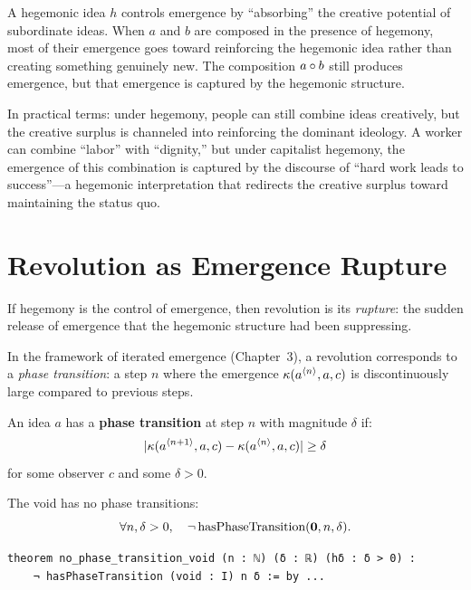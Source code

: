 \begin{interpretation}
A hegemonic idea $h$ controls emergence by ``absorbing'' the creative potential
of subordinate ideas. When $a$ and $b$ are composed in the presence of hegemony,
most of their emergence goes toward reinforcing the hegemonic idea rather than
creating something genuinely new. The composition $a \circ b$ still produces
emergence, but that emergence is captured by the hegemonic structure.

In practical terms: under hegemony, people can still combine ideas creatively,
but the creative surplus is channeled into reinforcing the dominant ideology.
A worker can combine ``labor'' with ``dignity,'' but under capitalist hegemony,
the emergence of this combination is captured by the discourse of ``hard work
leads to success''---a hegemonic interpretation that redirects the creative
surplus toward maintaining the status quo.
\end{interpretation}


\section{Revolution as Emergence Rupture}

If hegemony is the control of emergence, then revolution is its \emph{rupture}:
the sudden release of emergence that the hegemonic structure had been suppressing.

In the framework of iterated emergence (Chapter~3), a revolution corresponds to
a \emph{phase transition}: a step $n$ where the emergence $\kappa(a^{\langle n \rangle}, a, c)$
is discontinuously large compared to previous steps.

\begin{definition}
\label{def:phase-transition}
An idea $a$ has a \textbf{phase transition} at step $n$ with magnitude $\delta$ if:
\[
  |\kappa(a^{\langle n+1 \rangle}, a, c) - \kappa(a^{\langle n \rangle}, a, c)| \geq \delta
\]
for some observer $c$ and some $\delta > 0$.
\end{definition}

\begin{theorem}
\label{thm:no-phase-transition-void}
The void has no phase transitions:
\[
  \forall n, \delta > 0, \quad \neg\, \text{hasPhaseTransition}(\mathbf{0}, n, \delta).
\]
\end{theorem}

\begin{lstlisting}[caption={Phase transitions (IDT\_v3\_Emergence.lean)}]
theorem no_phase_transition_void (n : ℕ) (δ : ℝ) (hδ : δ > 0) :
    ¬ hasPhaseTransition (void : I) n δ := by ...
\end{lstlisting}

